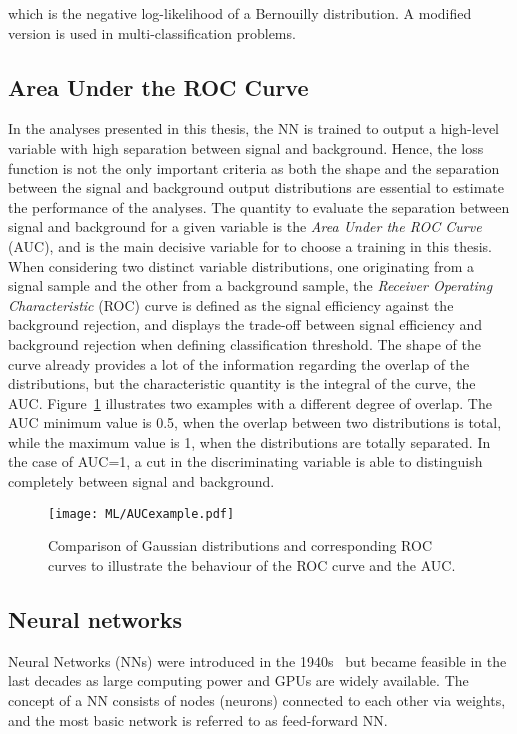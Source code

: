 which is the negative log-likelihood of a Bernouilly distribution. A modified version is used in multi-classification problems. 

\subsection{Area Under the ROC Curve}

In the analyses presented in this thesis, the NN is trained to output a high-level variable with high separation between signal and background. Hence, the loss function is not the only important criteria as both the shape and the separation between the signal and background output distributions are essential to estimate the performance of the analyses. The quantity to evaluate the separation between signal and background for a given variable is the \textit{Area Under the ROC Curve} (AUC), and is the main decisive variable for to choose a training in this thesis.\\

When considering two distinct variable distributions, one originating from a signal sample and the other from a background sample, the \textit{Receiver Operating Characteristic} (ROC) curve is defined as the signal efficiency against the background rejection, and displays the trade-off between signal efficiency and background rejection when defining classification threshold. The shape of the curve already provides a lot of the information regarding the overlap of the distributions, but the characteristic quantity is the integral of the curve, the AUC. Figure~\ref{ML:AUC} illustrates two examples with a different degree of overlap. The AUC minimum value is 0.5, when the overlap between two distributions is total, while the maximum value is 1, when the distributions are totally separated. In the case of AUC=1, a cut in the discriminating variable is able to distinguish completely between signal and background.

\begin{figure}[htbp]
    \RawFloats
    \begin{center}
    \texttt{[image: ML/AUCexample.pdf]}
    \caption{
        Comparison of Gaussian distributions and corresponding ROC curves to illustrate the behaviour of the ROC curve and the AUC.
    }
    \label{ML:AUC}
    \end{center}
\end{figure}

\subsection{Neural networks}
\label{ML:SectionNN}
Neural Networks (NNs) were introduced in the 1940s~\cite{McCulloch1943} but became feasible in the last decades as large computing power and GPUs are widely available. The concept of a NN consists of nodes (neurons) connected to each other via weights, and the most basic network is referred to as feed-forward NN.\\


